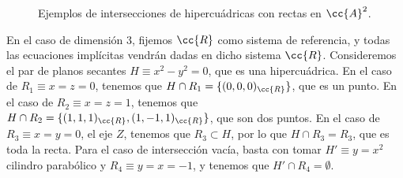 \begin{ejercicio}
\begin{figure}[H]
\begin{subfigure}{0.45\linewidth}
        \end{subfigure}\hfill
        \begin{subfigure}{0.45\linewidth}
        \end{subfigure}
        \caption{Ejemplos de intersecciones de hipercuádricas con rectas en $\cc{A}^2$.}
    \end{figure}

    En el caso de dimensión 3, fijemos $\cc{R}$ como sistema de referencia, y todas las ecuaciones implícitas vendrán dadas en dicho sistema $\cc{R}$.
    Consideremos el par de planos secantes $H\equiv x^2-y^2=0$, que es una hipercuádrica. En el caso de $R_1\equiv x=z=0$, tenemos que $H\cap R_1=\{(0,0,0)_{\cc{R}}\}$, que es un punto.
    En el caso de $R_2\equiv x=z=1$, tenemos que $H\cap R_2=\{(1,1,1)_{\cc{R}}, (1,-1,1)_{\cc{R}}\}$, que son dos puntos.
    En el caso de $R_3\equiv x=y=0$, el eje $Z$, tenemos que $R_3\subset H$, por lo que $H\cap R_3=R_3$, que es toda la recta. Para el caso de intersección
    vacía, basta con tomar $H'\equiv y=x^2$ cilindro parabólico y $R_4\equiv y=x=-1$, y tenemos que $H'\cap R_4=\emptyset$.
\end{ejercicio}
